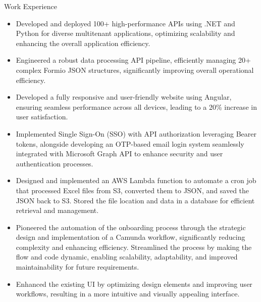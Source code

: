\documentclass{resume}
\begin{document}
\begin{experienceSection}{Work Experience}
    \experienceItem[
        company={EXL Digital},
        location={Noida Sec-144},
        position={FullStack Developer},
        duration={Aug 2023 – Present}
    ]
    \begin{itemize}
        \itemsep -6pt {}
         \item Developed and deployed 100+ high-performance APIs using .NET and Python for diverse multitenant applications, optimizing scalability and enhancing the overall application efficiency.
      
        \item Engineered a robust data processing API pipeline, efficiently managing 20+ complex Formio JSON structures, significantly improving overall operational efficiency.
        \item Developed a fully responsive and user-friendly website using Angular, ensuring seamless performance across all devices, leading to a 20\% increase in user satisfaction.
        \item Implemented Single Sign-On (SSO) with API authorization leveraging Bearer tokens, alongside developing an OTP-based email login system seamlessly integrated with Microsoft Graph API to enhance security and user authentication processes.
        \item Designed and implemented an AWS Lambda function to automate a cron job that processed Excel files from S3, converted them to JSON, and saved the JSON back to S3. Stored the file location and data in a database for efficient retrieval and management.
        \item Pioneered the automation of the onboarding process through the strategic design and implementation of a Camunda workflow, significantly reducing complexity and enhancing efficiency. Streamlined the process by making the flow and code dynamic, enabling scalability, adaptability, and improved maintainability for future requirements.
       
    \end{itemize}

    \experienceItem[
        company={Nokia},
        location={Chennai},
        position={Web Developer Intern},
        duration={Jun 2018 – Jul 2018}
    ]
    \begin{itemize}
        \itemsep -6pt {}
        \item Enhanced the existing UI by optimizing design elements and improving user workflows, resulting in a more intuitive and visually appealing interface.

    \end{itemize}

\end{experienceSection}
\end{document}
